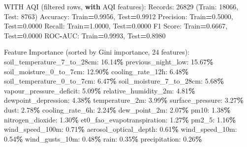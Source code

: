 \documentclass[
  letterpaper,
  DIV=11,
  numbers=noendperiod]{scrartcl}
\newenvironment{Shaded}{\begin{snugshade}}{\end{snugshade}}
\newcommand{\BuiltInTok}[1]{#1}
\newcommand{\ControlFlowTok}[1]{\textcolor[rgb]{0.13,0.29,0.53}{\textbf{#1}}}
\newcommand{\DecValTok}[1]{\textcolor[rgb]{0.00,0.00,0.81}{#1}}
\newcommand{\FloatTok}[1]{\textcolor[rgb]{0.00,0.00,0.81}{#1}}
\newcommand{\NormalTok}[1]{#1}
\newcommand{\OperatorTok}[1]{\textcolor[rgb]{0.81,0.36,0.00}{\textbf{#1}}}
\begin{document}
\begin{Shaded}
\begin{Highlighting}[]
\NormalTok{WITH AQI (filtered rows, }\ControlFlowTok{with}\NormalTok{ AQI features):}
\NormalTok{  Records: }\DecValTok{26829}\NormalTok{ (Train: }\DecValTok{18066}\NormalTok{, Test: }\DecValTok{8763}\NormalTok{)}
\NormalTok{  Accuracy: Train}\OperatorTok{=}\FloatTok{0.9956}\NormalTok{, Test}\OperatorTok{=}\FloatTok{0.9912}
\NormalTok{  Precision: Train}\OperatorTok{=}\FloatTok{0.5000}\NormalTok{, Test}\OperatorTok{=}\FloatTok{0.0000}
\NormalTok{  Recall: Train}\OperatorTok{=}\FloatTok{1.0000}\NormalTok{, Test}\OperatorTok{=}\FloatTok{0.0000}
\NormalTok{  F1 Score: Train}\OperatorTok{=}\FloatTok{0.6667}\NormalTok{, Test}\OperatorTok{=}\FloatTok{0.0000}
\NormalTok{  ROC}\OperatorTok{{-}}\NormalTok{AUC: Train}\OperatorTok{=}\FloatTok{0.9993}\NormalTok{, Test}\OperatorTok{=}\FloatTok{0.8980}

\NormalTok{  Feature Importance (}\BuiltInTok{sorted}\NormalTok{ by Gini importance, }\DecValTok{24}\NormalTok{ features):}
\NormalTok{    soil\_temperature\_7\_to\_28cm: }\FloatTok{16.14}\OperatorTok{\%}
\NormalTok{    previous\_night\_low: }\FloatTok{15.67}\OperatorTok{\%}
\NormalTok{    soil\_moisture\_0\_to\_7cm: }\FloatTok{12.90}\OperatorTok{\%}
\NormalTok{    cooling\_rate\_12h: }\FloatTok{6.48}\OperatorTok{\%}
\NormalTok{    soil\_temperature\_0\_to\_7cm: }\FloatTok{6.47}\OperatorTok{\%}
\NormalTok{    soil\_moisture\_7\_to\_28cm: }\FloatTok{5.68}\OperatorTok{\%}
\NormalTok{    vapour\_pressure\_deficit: }\FloatTok{5.09}\OperatorTok{\%}
\NormalTok{    relative\_humidity\_2m: }\FloatTok{4.81}\OperatorTok{\%}
\NormalTok{    dewpoint\_depression: }\FloatTok{4.38}\OperatorTok{\%}
\NormalTok{    temperature\_2m: }\FloatTok{3.99}\OperatorTok{\%}
\NormalTok{    surface\_pressure: }\FloatTok{3.27}\OperatorTok{\%}
\NormalTok{    dust: }\FloatTok{2.78}\OperatorTok{\%}
\NormalTok{    cooling\_rate\_6h: }\FloatTok{2.24}\OperatorTok{\%}
\NormalTok{    dew\_point\_2m: }\FloatTok{2.07}\OperatorTok{\%}
\NormalTok{    pm10: }\FloatTok{1.38}\OperatorTok{\%}
\NormalTok{    nitrogen\_dioxide: }\FloatTok{1.30}\OperatorTok{\%}
\NormalTok{    et0\_fao\_evapotranspiration: }\FloatTok{1.27}\OperatorTok{\%}
\NormalTok{    pm2\_5: }\FloatTok{1.16}\OperatorTok{\%}
\NormalTok{    wind\_speed\_100m: }\FloatTok{0.71}\OperatorTok{\%}
\NormalTok{    aerosol\_optical\_depth: }\FloatTok{0.61}\OperatorTok{\%}
\NormalTok{    wind\_speed\_10m: }\FloatTok{0.54}\OperatorTok{\%}
\NormalTok{    wind\_gusts\_10m: }\FloatTok{0.48}\OperatorTok{\%}
\NormalTok{    rain: }\FloatTok{0.35}\OperatorTok{\%}
\NormalTok{    precipitation: }\FloatTok{0.26}\OperatorTok{\%}


\end{Highlighting}
\end{Shaded}
\end{document}
